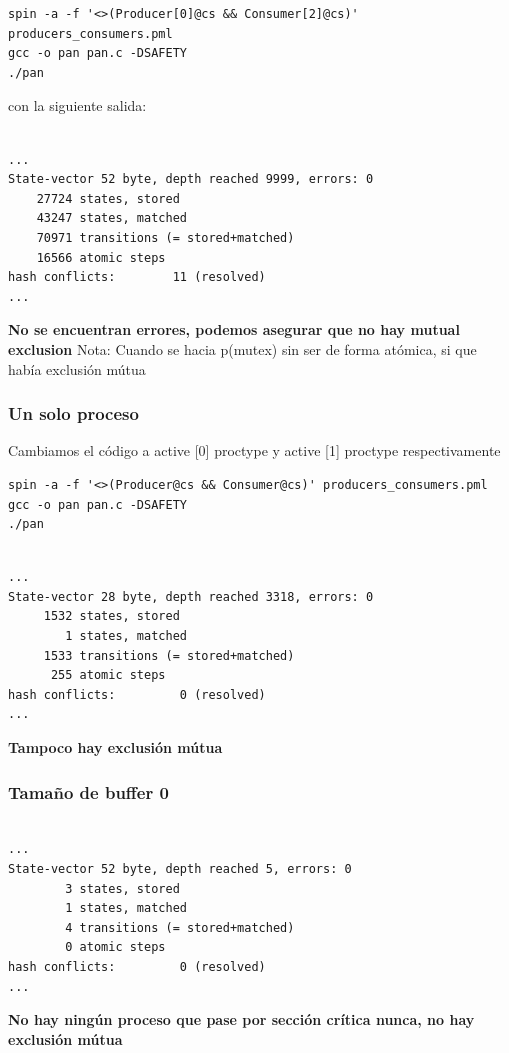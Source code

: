\documentclass[a4paper,12pt]{article}
\begin{document}
\begin{lstlisting}
spin -a -f '<>(Producer[0]@cs && Consumer[2]@cs)' producers_consumers.pml
gcc -o pan pan.c -DSAFETY
./pan
\end{lstlisting}
con la siguiente salida:
\begin{lstlisting}[frame=single]  % Start your code-block

...
State-vector 52 byte, depth reached 9999, errors: 0
    27724 states, stored
    43247 states, matched
    70971 transitions (= stored+matched)
    16566 atomic steps
hash conflicts:        11 (resolved)
...
\end{lstlisting}
\textbf{No se encuentran errores, podemos asegurar que no hay mutual exclusion}
Nota: Cuando se hacia p(mutex) sin ser de forma atómica, si que había exclusión mútua

\subsubsection{Un solo proceso}
Cambiamos el código a active [0] proctype y active [1] proctype respectivamente
\begin{lstlisting}
spin -a -f '<>(Producer@cs && Consumer@cs)' producers_consumers.pml
gcc -o pan pan.c -DSAFETY
./pan
\end{lstlisting}

\begin{lstlisting}[frame=single]  % Start your code-block

...
State-vector 28 byte, depth reached 3318, errors: 0
     1532 states, stored
        1 states, matched
     1533 transitions (= stored+matched)
      255 atomic steps
hash conflicts:         0 (resolved)
...
\end{lstlisting}
\textbf{Tampoco hay exclusión mútua}

\subsubsection{Tamaño de buffer 0}
\begin{lstlisting}[frame=single]  % Start your code-block

...
State-vector 52 byte, depth reached 5, errors: 0
        3 states, stored
        1 states, matched
        4 transitions (= stored+matched)
        0 atomic steps
hash conflicts:         0 (resolved)
...
\end{lstlisting}
\textbf{No hay ningún proceso que pase por sección crítica nunca, no hay exclusión mútua}
\end{document}
